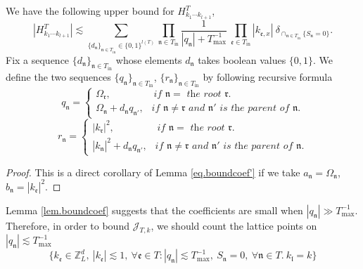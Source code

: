 \begin{lem}\label{lem.boundcoef}
We have the following upper bound for $H^T_{k_1\cdots k_{l+1}}$,
\begin{equation}\label{eq.boundcoef}
    |H^T_{k_1\cdots k_{l+1}}|\lesssim \sum_{\{d_{\mathfrak{n}}\}_{\mathfrak{n}\in T_{\text{in}}}\in\{0,1\}^{l(T)}}\prod_{\mathfrak{n}\in T_{\text{in}}}\frac{1}{|q_{\mathfrak{n}}|+T^{-1}_{\text{max}}}\ \prod_{\mathfrak{e}\in T_{\text{in}}}|k_{\mathfrak{e},x}|\ \delta_{\cap_{\mathfrak{n}\in T_{\text{in}}} \{S_{\mathfrak{n}}=0\}}.
\end{equation}
Fix a sequence $\{d_{\mathfrak{n}}\}_{\mathfrak{n}\in T_{\text{in}}}$ whose elements $d_{\mathfrak{n}}$ takes boolean values $\{0,1\}$. We define the two sequences $\{q_{\mathfrak{n}}\}_{\mathfrak{n}\in T_{\text{in}}}$, $\{r_{\mathfrak{n}}\}_{\mathfrak{n}\in T_{\text{in}}}$ by following recursive formula
\begin{equation}\label{eq.q_n}
    q_{\mathfrak{n}}=
    \begin{cases}
    \Omega_{\mathfrak{r}}, \qquad\qquad \textit{ if $\mathfrak{n}=$ the root $\mathfrak{r}$.}
    \\
    \Omega_{\mathfrak{n}}+d_{\mathfrak{n}}q_{\mathfrak{n}'},\ \ \textit{ if $\mathfrak{n}\neq\mathfrak{r}$ and $\mathfrak{n}'$ is the parent of $\mathfrak{n}$.}
    \end{cases}
\end{equation}
\begin{equation}\label{eq.r_n}
    r_{\mathfrak{n}}=
    \begin{cases}
    |k_{\mathfrak{r}}|^2, \qquad\qquad \textit{ if $\mathfrak{n}=$ the root $\mathfrak{r}$.}
    \\
    |k_{\mathfrak{n}}|^2+d_{\mathfrak{n}}q_{\mathfrak{n}'},\ \ \textit{ if $\mathfrak{n}\neq\mathfrak{r}$ and $\mathfrak{n}'$ is the parent of $\mathfrak{n}$.}
    \end{cases}
\end{equation}


\end{lem}
\begin{proof}
This is a direct corollary of Lemma \ref{eq.boundcoef'} if we take $a_{\mathfrak{n}}=\Omega_{\mathfrak{n}}$, $b_{\mathfrak{n}}=|k_{\mathfrak{e}}|^2$. 
\end{proof}


Lemma \ref{lem.boundcoef} suggests that the coefficients are small when $|q_{\mathfrak{n}}|\gg T^{-1}_{\text{max}}$. Therefore, in order to bound $\mathcal{J}_{T,k}$, we should count the lattice points on $|q_{\mathfrak{n}}|\lesssim T^{-1}_{\text{max}}$
\begin{equation}\label{eq.diophantineeq''}
    \{k_{\mathfrak{e}}\in \mathbb{Z}^d_L,\ |k_{\mathfrak{e}}|\lesssim 1,\ \forall \mathfrak{e}\in T: |q_{\mathfrak{n}}|\lesssim T^{-1}_{\text{max}},\ S_{\mathfrak{n}}=0,\ \forall \mathfrak{n}\in T.\ k_{\mathfrak{l}}=k\}
\end{equation}

